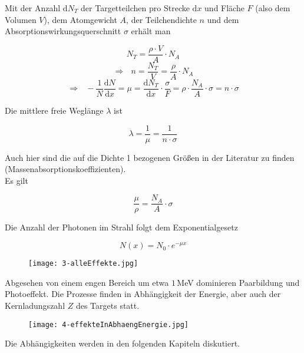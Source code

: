 Mit der Anzahl $\mathrm{d}N_T$ der Targetteilchen pro Strecke $\mathrm{d}x$ und Fläche $F$ (also
dem Volumen $V$), dem Atomgewicht $A$, der Teilchendichte $n$ und dem Absorptionswirkungsquerschnitt
$\sigma$ erhält man

\[N_T=\frac{\rho\cdot V}{A}\cdot N_A\]
\[\Rightarrow~~~n=\frac{N_T}{V}=\frac{\rho}{A}\cdot N_A\]
\[\Rightarrow~~~-\frac{1}{N}\frac{\mathrm{d}N}{\mathrm{d}x}=\mu=\frac{\mathrm{d}N_T}{\mathrm{d}x}\cdot
\frac{\sigma}{F}=\rho\cdot\frac{N_A}{A}\cdot\sigma=n\cdot\sigma \]

Die mittlere freie Weglänge $\lambda$ ist

\[ \lambda = \frac{1}{\mu}=\frac{1}{n\cdot \sigma} \]

Auch hier sind die auf die Dichte 1 bezogenen Größen in der Literatur zu finden
(Massenabsorptionskoeffizienten). 
\\
Es gilt

\[ \frac{\mu}{\rho}=\frac{N_A}{A}\cdot \sigma \]

\begin{figure}[H]
		\centering
		
\end{figure}

Die Anzahl der Photonen im Strahl folgt dem Exponentialgesetz

\[N(x)=N_0\cdot e^{-\mu x} \]

\begin{figure}[H]
	\centering
	\texttt{[image: 3-alleEffekte.jpg]}
\end{figure}

Abgesehen von einem engen Bereich um etwa $1\,$MeV dominieren Paarbildung und Photoeffekt. Die
Prozesse finden in Abhängigkeit der Energie, aber auch der Kernladungszahl $Z$ des Targets statt. 

\begin{figure}[H]
	\centering
	\texttt{[image: 4-effekteInAbhaengEnergie.jpg]}
\end{figure}

Die Abhängigkeiten werden in den folgenden Kapiteln diskutiert. 
\FloatBarrier